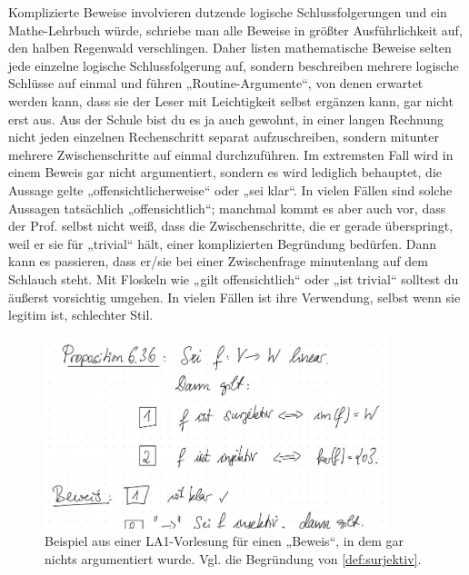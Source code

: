 \begin{bem}
    Komplizierte Beweise involvieren dutzende logische Schlussfolgerungen und ein Mathe-Lehrbuch würde, schriebe man alle Beweise in größter Ausführlichkeit auf, den halben Regenwald verschlingen. Daher listen mathematische Beweise selten jede einzelne logische Schlussfolgerung auf, sondern beschreiben mehrere logische Schlüsse auf einmal und führen „Routine-Argumente“, von denen erwartet werden kann, dass sie der Leser mit Leichtigkeit selbst ergänzen kann, gar nicht erst aus. Aus der Schule bist du es ja auch gewohnt, in einer langen Rechnung nicht jeden einzelnen Rechenschritt separat aufzuschreiben, sondern mitunter mehrere Zwischenschritte auf einmal durchzuführen. Im extremsten Fall wird in einem Beweis gar nicht argumentiert, sondern es wird lediglich behauptet, die Aussage gelte „offensichtlicherweise“ oder „sei klar“. In vielen Fällen sind solche Aussagen tatsächlich „offensichtlich“; manchmal kommt es aber auch vor, dass der Prof. selbst nicht weiß, dass die Zwischenschritte, die er gerade überspringt, weil er sie für „trivial“ hält, einer komplizierten Begründung bedürfen. Dann kann es passieren, dass er/sie bei einer Zwischenfrage minutenlang auf dem Schlauch steht. Mit Floskeln wie „gilt offensichtlich“ oder „ist trivial“ solltest du äußerst vorsichtig umgehen. In vielen Fällen ist ihre Verwendung, selbst wenn sie legitim ist, schlechter Stil.
    \begin{figure}[ht]
        \includegraphics[width=10cm]{./_img/Istklar.jpeg}
        \centering \caption{Beispiel aus einer LA1-Vorlesung für einen „Beweis“, in dem gar nichts argumentiert wurde. Vgl. die Begründung von \cref{def:surjektiv}.}
    \end{figure}
\end{bem}


